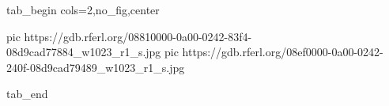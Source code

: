  
 
 
 
 


\ifcmt
  tab_begin cols=2,no_fig,center

     pic https://gdb.rferl.org/08810000-0a00-0242-83f4-08d9cad77884_w1023_r1_s.jpg
		 pic https://gdb.rferl.org/08ef0000-0a00-0242-240f-08d9cad79489_w1023_r1_s.jpg

  tab_end
\fi
